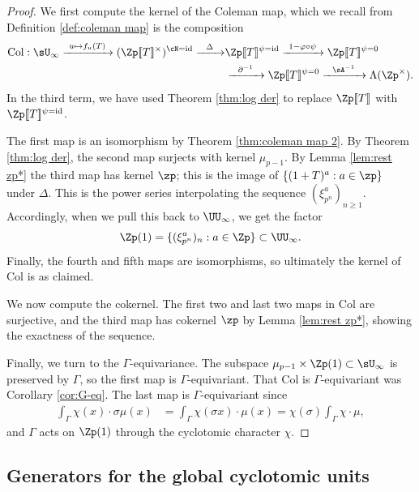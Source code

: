 \documentclass[a4paper,10pt, english, reqno]{smfart}
\newcommand{\lsem}{[\! [}
\newcommand{\rsem}{]\! ]}
\newcommand{\GG}{\Gamma}
\numberwithin{equation}{section}
\begin{document}
\begin{proof}
We first compute the kernel of the Coleman map, which we recall from Definition \ref{def:coleman map} is the composition 
\begin{align*}
\mathrm{Col} :	\sU_\infty \xrightarrow{\ u \mapsto f_u(T)\ } (\Zp\lsem T\rsem ^\times)^{\cN=\mathrm{id}} \xrightarrow {\ \ \Delta\ \ } &\Zp\lsem T\rsem ^{\psi=\mathrm{id}} \xrightarrow{\ 1-\varphi\circ\psi\ } \Zp\lsem T\rsem ^{\psi = 0}\\
&\xrightarrow{\ \ \partial^{-1}\ \ }\Zp\lsem T\rsem ^{\psi = 0} \xrightarrow{\ \ \sA^{-1}\ \ } \Lambda(\Zp^\times).
\end{align*}
In the third term, we have used Theorem \ref{thm:log der} to replace $\Zp\lsem T\rsem$ with $\Zp\lsem T \rsem^{\psi=\mathrm{id}}$.


The first map is an isomorphism by Theorem \ref{thm:coleman map 2}. By Theorem \ref{thm:log der}, the second map surjects with kernel $\mu_{p - 1}$. By Lemma \ref{lem:rest zp*} the third map has kernel $\zp$; this is the image of $\{(1 + T)^a : a \in \zp\}$ under $\Delta$. This is the power series interpolating the sequence $(\xi_{p^n}^a)_{n \geq 1}$. Accordingly, when we pull this back to $\UU_\infty$, we get the factor
	\[\Zp(1) = \{(\xi_{p^n}^a)_n : a \in \Zp\} \subset \UU_\infty.\]
Finally, the fourth and fifth maps are isomorphisms, so ultimately the kernel of $\mathrm{Col}$ is as claimed. 

We now compute the cokernel. The first two and last two maps in $\mathrm{Col}$ are surjective, and the third map has cokernel $\zp$ by Lemma \ref{lem:rest zp*}, showing the exactness of the sequence.
	
	Finally, we turn to the $\GG$-equivariance. The subspace $\mu_{p-1} \times \Zp(1) \subset \sU_\infty$ is preserved by $\GG$, so the first map is $\GG$-equivariant. That $\mathrm{Col}$ is $\GG$-equivariant was Corollary \ref{cor:G-eq}. The last map is $\GG$-equivariant since
	\begin{align*}
		\int_{\GG} \chi(x) \cdot \sigma \mu(x) &= \int_{\GG} \chi(\sigma x) \cdot \mu(x)
		= \chi(\sigma)\int_{\GG}\chi \cdot \mu,
	\end{align*}
	and $\GG$ acts on $\Zp(1)$ through the cyclotomic character $\chi$.
\end{proof}








\subsection{Generators for the global cyclotomic units}
\end{document}
